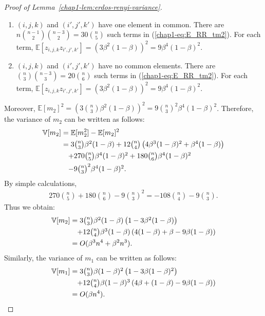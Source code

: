 {\begin{proof}[Proof of Lemma~\ref{chap1-lem:erdos-renyi-variance}]
\begin{enumerate}
	\item $(i,j,k)$ and $(i',j',k')$ have one element in common. 
	There are $n \binom{n-1}{2} \binom{n-3}{2} = 30\binom{n}{5}$ such terms in (\ref{chap1-eq:E_RR_tm2}).  For each term, $\mathbb{E}[z_{i,j,k}z_{i',j',k'}]=(3\beta^2(1-\beta))^2 = 9\beta^4(1-\beta)^2$. 
	\item $(i,j,k)$ and $(i',j',k')$ have no common elements. 
	There are $\binom{n}{3}\binom{n-3}{3} = 20\binom{n}{6}$ such terms in (\ref{chap1-eq:E_RR_tm2}). 
	For each term, $\mathbb{E}[z_{i,j,k}z_{i',j',k'}]=(3\beta^2(1-\beta))^2 = 9\beta^4(1-\beta)^2$. 
\end{enumerate}
Moreover, $\mathbb{E}[m_2]^2 = (3\binom{n}{3}\beta^2(1-\beta))^2 = 9\binom{n}{3}^2\beta^4(1-\beta)^2$. 
Therefore, the variance of $m_2$ can be written as follows:
\begin{align*}
  \mathbb{V}[m_2] 
  &= \mathbb{E}[m_2^2] - \mathbb{E}[m_2]^2 \nonumber\\
  &= \textstyle{3\binom{n}{3}\beta^2(1-\beta) + 12\binom{n}{4}\left(4\beta^3(1-\beta)^2 + \beta^4(1-\beta)\right)} \nonumber\\
  &\hspace{3.5mm} \textstyle{+ 270\binom{n}{5}\beta^4(1-\beta)^2 + 180\binom{n}{6}\beta^4(1-\beta)^2} \nonumber\\
  &\hspace{3.5mm} \textstyle{- 9\binom{n}{3}^2\beta^4(1-\beta)^2.}
\end{align*}
By simple calculations,
\begin{align*}
\textstyle{270\binom{n}{5} + 180\binom{n}{6} - 9\binom{n}{3}^2 = -108\binom{n}{4}-9\binom{n}{3}.}
\end{align*}
Thus we obtain:
\begin{align*}
\mathbb{V}[m_2] 
&= \textstyle{3\binom{n}{3}\beta^2(1-\beta)\left(1 - 3\beta^2(1-\beta)\right)} \nonumber\\
&\hspace{3.5mm} \textstyle{+ 12\binom{n}{4} \beta^3(1-\beta) \left(4(1-\beta) + \beta - 9\beta(1-\beta) \right)} \\
&= O(\beta^3 n^4 + \beta^2n^3).
\end{align*}
Similarly, the variance of $m_1$ can be written as follows:
\begin{align*}
\mathbb{V}[m_1] 
&= \textstyle{3\binom{n}{3}\beta(1-\beta)^2\left(1 - 3\beta(1-\beta)^2\right)} \nonumber\\
&\hspace{3.5mm} \textstyle{+ 12\binom{n}{4} \beta(1-\beta)^3 \left(4\beta +
(1-\beta) - 9\beta(1-\beta) \right)} \\
&= O(\beta n^4).
\end{align*}
\end{proof}

}
